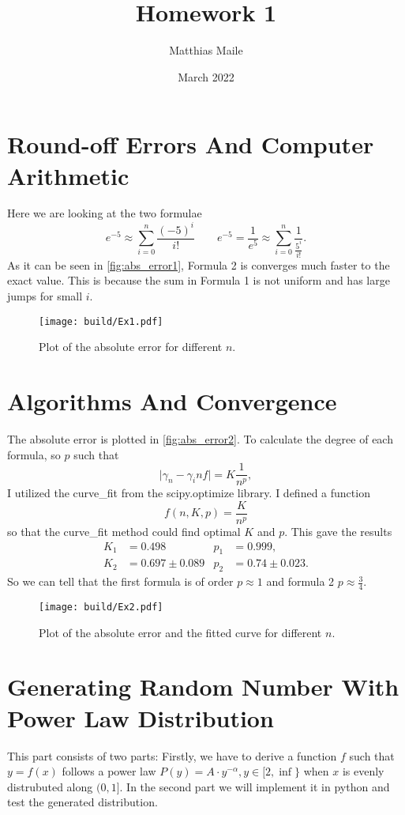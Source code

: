 \documentclass{article}
\author{Matthias Maile}
\date{March 2022}
\title{Homework 1}
\begin{document}
\maketitle
\tableofcontents

\section{Round-off Errors And Computer Arithmetic}
\label{sec:Round-off errors and Computer Arithmetic}
Here we are looking at the two formulae
\[
  e^{-5} \approx \sum_{i=0}^n \frac{(-5)^i}{i!}
  \qquad
  e^{-5} = \frac{1}{e^5} \approx \sum_{i=0}^n \frac{1}{\frac{5^i}{i!}}.
\]
As it can be seen in \autoref{fig:abs_error1}, Formula 2 is converges much faster 
to the exact value. This is because the sum in Formula 1 is not uniform and has 
large jumps for small $i$.

\begin{figure}[H]
	\centering
	\texttt{[image: build/Ex1.pdf]}
	\caption{Plot of the absolute error for different $n$.}
	\label{fig:abs_error1}
\end{figure}

\section{Algorithms And Convergence}
\label{sec:Algorithms and Convergence}
The absolute error is plotted in \autoref{fig:abs_error2}. To calculate the degree of each formula, so 
$p$ such that
\[
  \vert \gamma_n - \gamma_inf \vert = K \frac{1}{n^p},
\]
I utilized the curve\_fit from the scipy.optimize library. I defined a function
\[
  f(n, K, p) = \frac{K}{n^p}
\]
so that the curve\_fit method could find optimal $K$ and $p$. This gave the results
\begin{align}
  K_1 &= 0.498 & p_1 &= 0.999, \\
  K_2 &= 0.697 \pm 0.089 & p_2 &= 0.74 \pm 0.023.
\end{align}
So we can tell that the first formula is of order $p\approx1$ and formula 2 $p\approx \frac{3}{4}$.

\begin{figure}[H]
	\centering
	\texttt{[image: build/Ex2.pdf]}
	\caption{Plot of the absolute error and the fitted curve for different $n$.}
	\label{fig:abs_error2}
\end{figure}


\section{Generating Random Number With Power Law Distribution}
\label{sec:Generating Random Number With Power Law Distribution}
This part consists of two parts: Firstly, we have to derive a function $f$ such that $y = f(x)$ follows
a power law $P(y) = A \cdot y^{-\alpha}, y \in [2, \inf\}$ when $x$ is evenly distrubuted along $(0,1]$. 
In the second part we will implement it in python and test the generated distribution.
\end{document}
